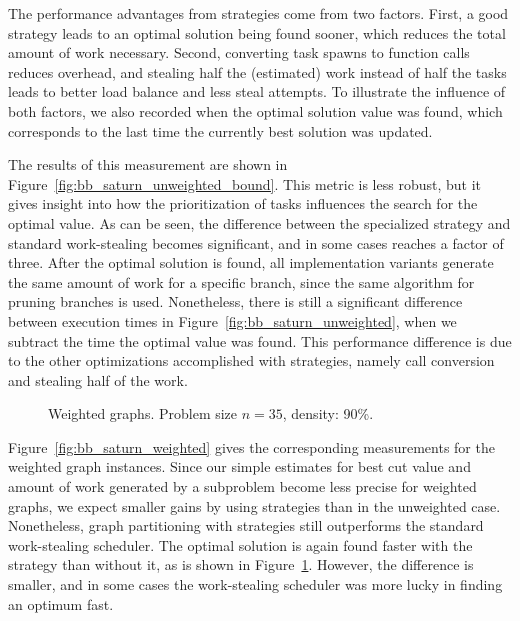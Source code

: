 \documentclass[a4paper,11pt]{article}
\begin{document}
The performance advantages from strategies come from two
factors. First, a good strategy leads to an optimal solution being
found sooner, which reduces the total amount of work
necessary. Second, converting task spawns to function calls reduces
overhead, and stealing half the (estimated) work instead of half the
tasks leads to better load balance and less steal attempts. To
illustrate the influence of both factors, we also recorded when the
optimal solution value was found, which corresponds to the last time
the currently best solution was updated.

The results of this measurement are shown in
Figure~\ref{fig:bb_saturn_unweighted_bound}. This metric is less
robust, but it gives insight into how the prioritization of tasks
influences the search for the optimal value. As can be seen, the
difference between the specialized strategy and standard work-stealing
becomes significant, and in some cases reaches a factor of
three. After the optimal solution is found, all implementation
variants generate the same amount of work for a specific branch, since
the same algorithm for pruning branches is used. Nonetheless, there is
still a significant difference between execution times in
Figure~\ref{fig:bb_saturn_unweighted}, when we subtract the time the
optimal value was found. This performance difference is due to the
other optimizations accomplished with strategies, namely call
conversion and stealing half of the work.

\begin{figure}
\centering
{}
\label{fig:bb_saturn_weighted}
\caption{Weighted graphs. Problem size $n=35$, density: 90\%.}
\label{fig:bb_saturn_weighted_bound}
\end{figure}

Figure~\ref{fig:bb_saturn_weighted} gives the corresponding
measurements for the weighted graph instances.  Since our simple
estimates for best cut value and amount of work generated by a
subproblem become less precise for weighted graphs, we expect smaller
gains by using strategies than in the unweighted case.  Nonetheless,
graph partitioning with strategies still outperforms the standard
work-stealing scheduler. The optimal solution is again found
faster with the strategy than without it, as is shown in
Figure~\ref{fig:bb_saturn_weighted_bound}. However, the difference is
smaller, and in some cases the work-stealing scheduler was more
lucky in finding an optimum fast.
\end{document}

